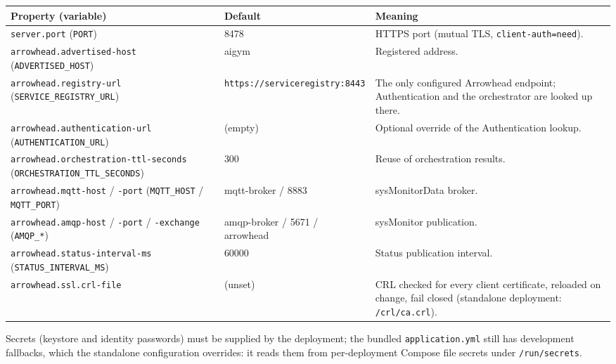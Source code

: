 \documentclass[a4paper]{arrowhead}
\begin{document}
\noindent\begin{longtable}{| p{5.4cm} | p{3.4cm} | p{6.4cm} |} \hline
\rowcolor{gray!33} Property (variable) & Default & Meaning \\ \hline \endhead
\texttt{server.\allowbreak{}port} (\texttt{PORT}) & 8478 & HTTPS port (mutual TLS, \texttt{client-\allowbreak{}auth=\allowbreak{}need}). \\ \hline
\texttt{arrowhead.\allowbreak{}advertised-\allowbreak{}host} (\texttt{ADVERTISED\_\allowbreak{}HOST}) & aigym & Registered address. \\ \hline
\texttt{arrowhead.\allowbreak{}registry-\allowbreak{}url} (\texttt{SERVICE\_\allowbreak{}REGISTRY\_\allowbreak{}URL}) & \texttt{https:\allowbreak{}/\allowbreak{}/\allowbreak{}serviceregistry:\allowbreak{}8443} & The only configured Arrowhead endpoint; Authentication and the orchestrator are looked up there. \\ \hline
\texttt{arrowhead.\allowbreak{}authentication-\allowbreak{}url} (\texttt{AUTHENTICATION\_\allowbreak{}URL}) & (empty) & Optional override of the Authentication lookup. \\ \hline
\texttt{arrowhead.\allowbreak{}orchestration-\allowbreak{}ttl-\allowbreak{}seconds} (\texttt{ORCHESTRATION\_\allowbreak{}TTL\_\allowbreak{}SECONDS}) & 300 & Reuse of orchestration results. \\ \hline
\texttt{arrowhead.\allowbreak{}mqtt-\allowbreak{}host} / \texttt{-port} (\texttt{MQTT\_\allowbreak{}HOST} / \texttt{MQTT\_\allowbreak{}PORT}) & mqtt-broker / 8883 & sysMonitorData broker. \\ \hline
\texttt{arrowhead.\allowbreak{}amqp-\allowbreak{}host} / \texttt{-port} / \texttt{-exchange} (\texttt{AMQP\_\allowbreak{}*}) & amqp-broker / 5671 / arrowhead & sysMonitor publication. \\ \hline
\texttt{arrowhead.\allowbreak{}status-\allowbreak{}interval-\allowbreak{}ms} (\texttt{STATUS\_\allowbreak{}INTERVAL\_\allowbreak{}MS}) & 60000 & Status publication interval. \\ \hline
\texttt{arrowhead.\allowbreak{}ssl.\allowbreak{}crl-\allowbreak{}file} & (unset) & CRL checked for every client certificate, reloaded on change, fail closed (standalone deployment: \texttt{/\allowbreak{}crl/\allowbreak{}ca.\allowbreak{}crl}). \\ \hline
\end{longtable}

Secrets (keystore and identity passwords) must be supplied by the deployment; the bundled \texttt{application.\allowbreak{}yml} still has development fallbacks, which the standalone configuration overrides: it reads them from per-deployment Compose file secrets under \texttt{/\allowbreak{}run/\allowbreak{}secrets}.
\end{document}
